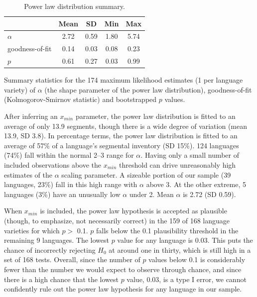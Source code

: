 \begin{table}

\caption{\label{tab:pl-xmin-summary}Power law distribution summary.}
\centering
\begin{threeparttable}
\begin{tabular}[t]{lcccc}
\toprule
\textbf{ } & \textbf{Mean} & \textbf{SD} & \textbf{Min} & \textbf{Max}\\
\midrule
$\alpha$ & 2.72 & 0.59 & 1.80 & 5.74\\
goodness-of-fit & 0.14 & 0.03 & 0.08 & 0.23\\
$p$ & 0.61 & 0.27 & 0.03 & 0.99\\
\bottomrule
\end{tabular}
\begin{tablenotes}
\item Summary statistics for the 174 maximum likelihood estimates (1 per language variety) of $\alpha$ (the shape parameter of the power law distribution), goodness-of-fit (Kolmogorov-Smirnov statistic) and bootstrapped $p$ values.
\end{tablenotes}
\end{threeparttable}
\end{table}

After inferring an \(x_{min}\) parameter, the power law distribution is fitted to an average of only 13.9 segments, though there is a wide degree of variation (mean 13.9, SD 3.8). In percentage terms, the power law distribution is fitted to an average of 57\% of a language's segmental inventory (SD 15\%). 124 languages (74\%) fall within the normal 2--3 range for \(\alpha\). Having only a small number of included observations above the \(x_{min}\) threshold can drive unreasonably high estimates of the \(\alpha\) scaling parameter. A sizeable portion of our sample (39 languages, 23\%) fall in this high range with \(\alpha\) above 3. At the other extreme, 5 languages (3\%) have an unusually low \(\alpha\) under 2. Mean \(\alpha\) is 2.72 (SD 0.59).

When \(x_{min}\) is included, the power law hypothesis is accepted as plausible (though, to emphasize, not necessarily correct) in the 159 of 168 language varieties for which \(p >\) 0.1. \(p\) falls below the 0.1 plausibility threshold in the remaining 9 languages. The lowest \(p\) value for any language is 0.03. This puts the chance of incorrectly rejecting \(H_0\) at around one in thirty, which is still high in a set of 168 tests. Overall, since the number of \(p\) values below 0.1 is considerably fewer than the number we would expect to observe through chance, and since there is a high chance that the lowest \(p\) value, 0.03, is a type I error, we cannot confidently rule out the power law hypothesis for any language in our sample.

